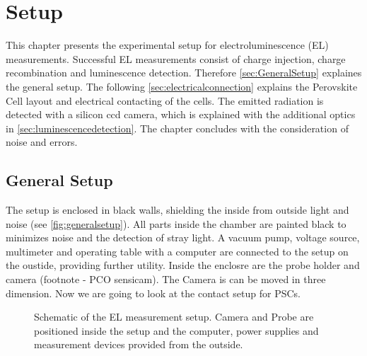 \chapter{Setup}
This chapter presents the experimental setup for electroluminescence (EL) measurements. Successful EL measurements consist of charge injection, charge recombination and luminescence detection. Therefore \autoref{sec:GeneralSetup} explaines the general setup. The following \autoref{sec:electricalconnection} explains the Perovskite Cell layout and electrical contacting of the cells. The emitted radiation is detected with a silicon ccd camera, which is explained with the additional optics in \autoref{sec:luminescencedetection}. The chapter concludes with the consideration of noise and errors.

\section{General Setup}\label{sec:GeneralSetup}
The setup is enclosed in black walls, shielding the inside from outside light and noise (see \autoref{fig:generalsetup}). All parts inside the chamber are painted black to minimizes noise and the detection of stray light. A vacuum pump, voltage source, multimeter and operating table with a computer are connected to the setup on the oustide, providing further utility. Inside the enclosre are the probe holder and camera (footnote - PCO sensicam). The Camera is can be moved in three dimension. Now we are going to look at the contact setup for PSCs.
\begin{figure}[h]
	\centering
	
	\caption{Schematic of the EL measurement setup. Camera and Probe are positioned inside the setup and the computer, power supplies and measurement devices provided from the outside.}
	\label{fig:generalsetup}
\end{figure}


